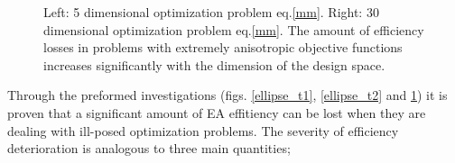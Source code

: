 \begin{figure}[h!]
\begin{minipage}[b]{0.5\linewidth}
 \centering
\end{minipage}
\begin{minipage}[b]{0.5\linewidth}
 \centering
\end{minipage}
\caption{Left: 5 dimensional optimization problem eq.\ref{mm}. Right: 30 dimensional optimization problem eq.\ref{mm}. The amount of efficiency losses in problems with extremely anisotropic objective functions increases significantly with the dimension of the design space.} 
\label{multimodres}
\end{figure}

Through the preformed investigations  (figs. \ref{ellipse_t1}, \ref{ellipse_t2} and \ref{multimodres}) it is proven that a significant amount of EA effitiency can be lost when they are dealing with ill-posed optimization problems. The severity of efficiency deterioration is analogous to three main quantities;

